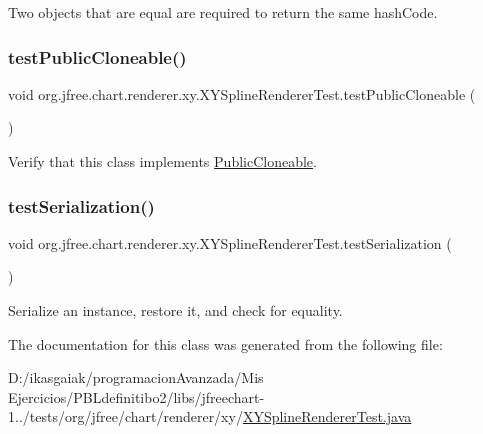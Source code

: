 Two objects that are equal are required to return the same hash\+Code. \mbox{\label{classorg_1_1jfree_1_1chart_1_1renderer_1_1xy_1_1_x_y_spline_renderer_test_a9d37e01b8f4b924a19d8b18a940e42b0}} 
\subsubsection{\texorpdfstring{test\+Public\+Cloneable()}{testPublicCloneable()}}
{\footnotesize\ttfamily void org.\+jfree.\+chart.\+renderer.\+xy.\+X\+Y\+Spline\+Renderer\+Test.\+test\+Public\+Cloneable (\begin{DoxyParamCaption}{ }\end{DoxyParamCaption})}

Verify that this class implements \mbox{\hyperlink{}{Public\+Cloneable}}. \mbox{\label{classorg_1_1jfree_1_1chart_1_1renderer_1_1xy_1_1_x_y_spline_renderer_test_a3bba864a9ce63ec679d8b3ed3c7a68cc}} 
\subsubsection{\texorpdfstring{test\+Serialization()}{testSerialization()}}
{\footnotesize\ttfamily void org.\+jfree.\+chart.\+renderer.\+xy.\+X\+Y\+Spline\+Renderer\+Test.\+test\+Serialization (\begin{DoxyParamCaption}{ }\end{DoxyParamCaption})}

Serialize an instance, restore it, and check for equality. 

The documentation for this class was generated from the following file\+:\begin{DoxyCompactItemize}
\item 
D\+:/ikasgaiak/programacion\+Avanzada/\+Mis Ejercicios/\+P\+B\+Ldefinitibo2/libs/jfreechart-\/1../tests/org/jfree/chart/renderer/xy/\mbox{\hyperlink{_x_y_spline_renderer_test_8java}{X\+Y\+Spline\+Renderer\+Test.\+java}}\end{DoxyCompactItemize}
